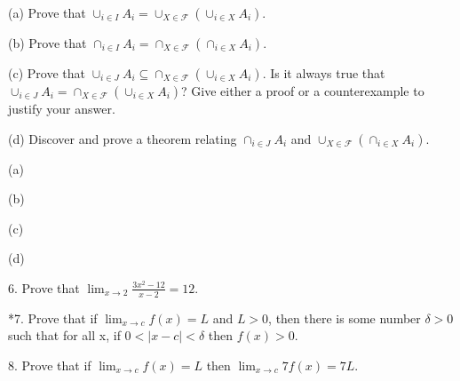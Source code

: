 \documentclass{article}
\begin{document}
\hspace{12pt}(a) Prove that $\cup_{i \in I} A_i = \cup_{X \in \mathcal{F}} (\cup_{i \in X} A_i)$.

\hspace{12pt}(b) Prove that $\cap_{i \in I} A_i = \cap_{X \in \mathcal{F}} (\cap_{i \in X} A_i)$.

\hspace{12pt}(c) Prove that $\cup_{i \in J} A_i \subseteq \cap_{X \in \mathcal{F}} (\cup_{i \in X} A_i)$. Is it always true that $\cup_{i \in J} A_i = \cap_{X \in \mathcal{F}} (\cup_{i \in X} A_i)$? Give either a proof or a counterexample to justify
your answer.

\hspace{12pt}(d) Discover and prove a theorem relating $\cap_{i \in J} A_i$ and $\cup_{X \in \mathcal{F}} (\cap_{i \in X} A_i)$.

\vspace{30pt}

(a)

\vspace{30pt}

(b)

\vspace{30pt}

(c)

\vspace{30pt}

(d)

\vspace{30pt}

6. Prove that $\displaystyle{\lim_{x \to 2} \frac{3x^2-12}{x-2} = 12}$.

\vspace{30pt}


\vspace{30pt}

*7. Prove that if $\displaystyle{\lim_{x \to c} f (x) = L}$ and $L > 0$, then there is some number $\delta > 0$
such that for all x, if $0 < |x - c| < \delta$ then $f (x) > 0$.


\vspace{30pt}


\vspace{30pt}

8. Prove that if $\displaystyle{\lim_{x \to c} f (x) = L}$ then $\displaystyle{\lim_{x \to c} 7 f (x) = 7L}$.


\vspace{30pt}


\vspace{30pt}
\end{document}
